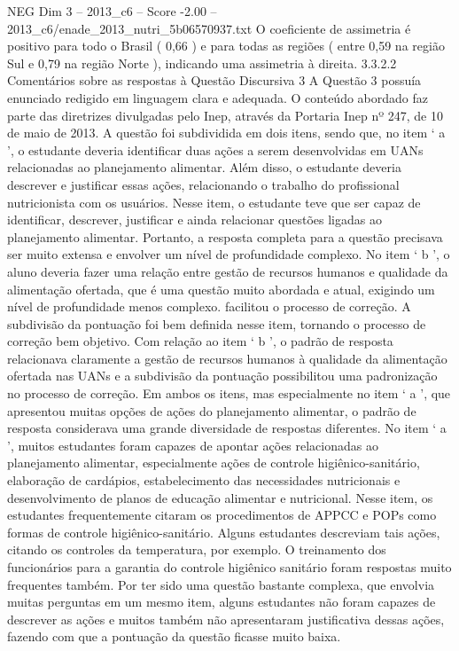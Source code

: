 \begin{textsample}{NEG Dim 3 – 2013\_c6 – Score -2.00 – 2013\_c6/enade\_2013\_nutri\_5b06570937.txt}
O coeficiente de assimetria é positivo para todo o Brasil ( 0,66 ) e para todas as regiões ( entre 0,59 na região Sul e 0,79 na região Norte ), indicando uma assimetria à direita. 3.3.2.2 Comentários sobre as respostas à Questão Discursiva 3 A Questão 3 possuía enunciado redigido em linguagem clara e adequada.
O conteúdo abordado faz parte das diretrizes divulgadas pelo Inep, através da Portaria Inep nº 247, de 10 de maio de 2013.
A questão foi subdividida em dois itens, sendo que, no item ‘ a ’, o estudante deveria identificar duas ações a serem desenvolvidas em UANs relacionadas ao planejamento alimentar.
Além disso, o estudante deveria descrever e justificar essas ações, relacionando o trabalho do profissional nutricionista com os usuários.
Nesse item, o estudante teve que ser capaz de identificar, descrever, justificar e ainda relacionar questões ligadas ao planejamento alimentar.
Portanto, a resposta completa para a questão precisava ser muito extensa e envolver um nível de profundidade complexo.
No item ‘ b ’, o aluno deveria fazer uma relação entre gestão de recursos humanos e qualidade da alimentação ofertada, que é uma questão muito abordada e atual, exigindo um nível de profundidade menos complexo. facilitou o processo de correção.
A subdivisão da pontuação foi bem definida nesse item, tornando o processo de correção bem objetivo.
Com relação ao item ‘ b ’, o padrão de resposta relacionava claramente a gestão de recursos humanos à qualidade da alimentação ofertada nas UANs e a subdivisão da pontuação possibilitou uma padronização no processo de correção.
Em ambos os itens, mas especialmente no item ‘ a ’, que apresentou muitas opções de ações do planejamento alimentar, o padrão de resposta considerava uma grande diversidade de respostas diferentes.
No item ‘ a ’, muitos estudantes foram capazes de apontar ações relacionadas ao planejamento alimentar, especialmente ações de controle higiênico-sanitário, elaboração de cardápios, estabelecimento das necessidades nutricionais e desenvolvimento de planos de educação alimentar e nutricional.
Nesse item, os estudantes frequentemente citaram os procedimentos de APPCC e POPs como formas de controle higiênico-sanitário.
Alguns estudantes descreviam tais ações, citando os controles da temperatura, por exemplo.
O treinamento dos funcionários para a garantia do controle higiênico sanitário foram respostas muito frequentes também.
Por ter sido uma questão bastante complexa, que envolvia muitas perguntas em um mesmo item, alguns estudantes não foram capazes de descrever as ações e muitos também não apresentaram justificativa dessas ações, fazendo com que a pontuação da questão ficasse muito baixa.

\end{textsample}
